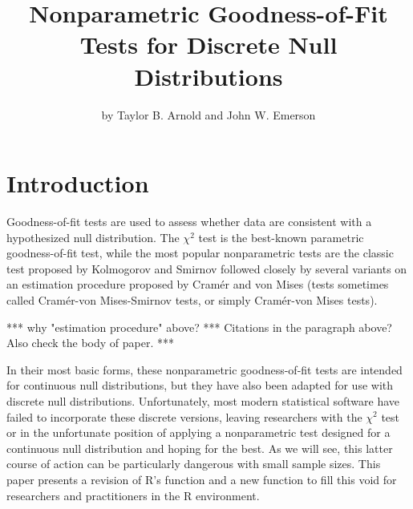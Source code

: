 \title{Nonparametric Goodness-of-Fit Tests for Discrete Null Distributions}
\author{by Taylor B. Arnold and John W. Emerson}

\maketitle




\section{Introduction}

Goodness-of-fit tests are used to assess whether data are consistent
with a hypothesized null distribution.  The $\chi^2$ test is the best-known
parametric goodness-of-fit test, while the most popular nonparametric tests
are the classic test proposed by Kolmogorov and Smirnov followed closely by
several variants on an estimation procedure proposed by
Cram\'{e}r and von Mises (tests sometimes called Cram\'{e}r-von Mises-Smirnov
tests, or simply Cram\'{e}r-von Mises tests).

*** why "estimation procedure" above?
*** Citations in the paragraph above?  Also check the body of paper. ***

In their most basic forms, these nonparametric goodness-of-fit
tests are intended for continuous null distributions, but they have
also been adapted for use with discrete null distributions.  Unfortunately,
most modern statistical software have failed to incorporate these discrete
versions, leaving researchers with the $\chi^2$ test or in the unfortunate
position of applying a nonparametric test designed for a continuous null
distribution and hoping for the best.
As we will see, this latter course of action can be particularly dangerous
with small sample sizes. This paper presents a revision of R's
 function and a new  function to
fill this void for researchers and practitioners in the R environment. 


